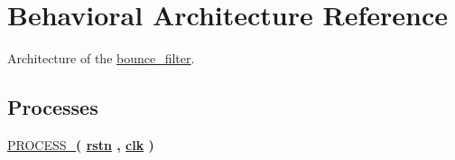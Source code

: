 \hypertarget{classbounce__filter_1_1Behavioral}{\section{Behavioral Architecture Reference}
\label{classbounce__filter_1_1Behavioral}
}


Architecture of the \hyperlink{classbounce__filter}{bounce\-\_\-filter}.  


\subsection*{Processes}
 \begin{DoxyCompactItemize}
\item 
\hypertarget{classbounce__filter_1_1Behavioral_a68c86990d057b8db759843e21da325c7}{\hyperlink{classbounce__filter_1_1Behavioral_a68c86990d057b8db759843e21da325c7}{P\-R\-O\-C\-E\-S\-S\-\_}{\bfseries  ( {\bfseries {\bfseries \hyperlink{classbounce__filter_aba021aec4b477b89079bb58ccadcc67e}{rstn}} \textcolor{vhdlchar}{ }\textcolor{vhdlchar}{ }\textcolor{vhdlchar}{ }} , {\bfseries {\bfseries \hyperlink{classbounce__filter_a8120037e0ee47c35ba2d79242209c72e}{clk}} \textcolor{vhdlchar}{ }} )}}\label{classbounce__filter_1_1Behavioral_a68c86990d057b8db759843e21da325c7}

\end{DoxyCompactItemize}
